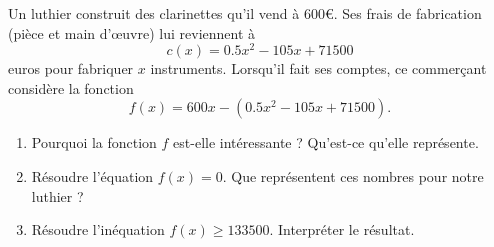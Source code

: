 
\begin{exercice}\label{exosmath-0557}

    Un luthier construit des clarinettes qu'il vend à \( 600\)€.  Ses frais de fabrication (pièce et main d'œuvre) lui reviennent à
    \begin{equation}
        c(x)=0.5x^2-105x+71500
    \end{equation}
    euros pour fabriquer \( x\) instruments. Lorsqu'il fait ses comptes, ce commerçant considère la fonction
    \begin{equation}
        f(x)=600x-(0.5x^2-105x+71500).
    \end{equation}
    \begin{enumerate}
        \item
            Pourquoi la fonction \( f\) est-elle intéressante ? Qu'est-ce qu'elle représente.
        \item
            Résoudre l'équation \( f(x)=0\). Que représentent ces nombres pour notre luthier ?
        \item
            Résoudre l'inéquation \( f(x)\geq 133500\). Interpréter le résultat.
    \end{enumerate}

\end{exercice}
